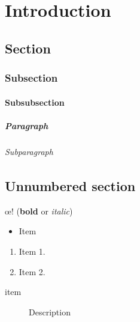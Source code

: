\chapter{Introduction}
\section{Section}
\subsection{Subsection}
\subsubsection{Subsubsection}
\paragraph{Paragraph}
\subparagraph{Subparagraph}

\section*{Unnumbered section}

\noindent \oe ! (\textbf{bold} or \textit{italic})

\begin{itemize}
  \item Item
\end{itemize}

\begin{enumerate}
  \item Item 1.
  \item Item 2.
\end{enumerate}

\begin{description}
  \item[item] Description
\end{description}
